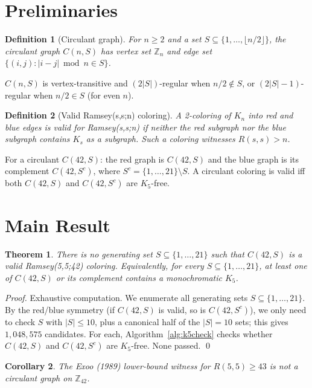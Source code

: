 \documentclass[11pt]{article}
\newtheorem{theorem}{Theorem}
\newtheorem{definition}{Definition}
\newtheorem{corollary}[theorem]{Corollary}
\begin{document}
\section{Preliminaries}

\begin{definition}[Circulant graph]
For $n \geq 2$ and a set $S \subseteq \{1,\ldots,\lfloor n/2 \rfloor\}$,
the \emph{circulant graph} $C(n,S)$ has vertex set $\mathbb{Z}_n$ and
edge set $\{(i,j) : |i-j| \bmod n \in S\}$.
\end{definition}

$C(n,S)$ is vertex-transitive and $(2|S|)$-regular when $n/2 \notin S$,
or $(2|S|-1)$-regular when $n/2 \in S$ (for even $n$).

\begin{definition}[Valid Ramsey(s,s;n) coloring]
A 2-coloring of $K_n$ into red and blue edges is \emph{valid for Ramsey(s,s;n)}
if neither the red subgraph nor the blue subgraph contains $K_s$ as a subgraph.
Such a coloring witnesses $R(s,s) > n$.
\end{definition}

For a circulant $C(42,S)$: the red graph is $C(42,S)$ and the blue graph is
its complement $C(42,S^c)$, where $S^c = \{1,\ldots,21\} \setminus S$.
A circulant coloring is valid iff both $C(42,S)$ and $C(42,S^c)$ are
$K_5$-free.

\section{Main Result}

\begin{theorem}\label{thm:main}
There is no generating set $S \subseteq \{1,\ldots,21\}$ such that
$C(42,S)$ is a valid Ramsey(5,5;42) coloring. Equivalently, for every
$S \subseteq \{1,\ldots,21\}$, at least one of $C(42,S)$ or its complement
contains a monochromatic $K_5$.
\end{theorem}

\begin{proof}
Exhaustive computation. We enumerate all generating sets $S \subseteq
\{1,\ldots,21\}$. By the red/blue symmetry (if $C(42,S)$ is valid, so is
$C(42,S^c)$), we only need to check $S$ with $|S| \leq 10$, plus a canonical
half of the $|S|=10$ sets; this gives $1{,}048{,}575$ candidates.
For each, Algorithm~\ref{alg:k5check} checks whether $C(42,S)$ and
$C(42,S^c)$ are $K_5$-free. None passed. \qed
\end{proof}

\begin{corollary}
The Exoo (1989) lower-bound witness for $R(5,5) \geq 43$ is not a
circulant graph on $\mathbb{Z}_{42}$.
\end{corollary}
\end{document}
